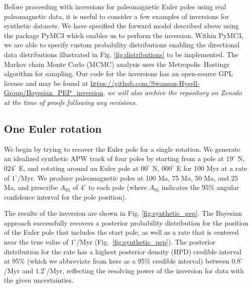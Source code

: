 \documentclass[11pt,letterpaper]{article}
\begin{document}
Before proceeding with inversions for paleomagnetic Euler poles using real paleomagnetic data, it is useful to consider a few examples of inversions for synthetic datasets. We have specified the forward model described above using the package PyMC3 \citep{Salvatier2016a} which enables us to perform the inversion. Within PyMC3, we are able to specify custom probability distributions enabling the directional data distributions illustrated in Fig. \ref{fig:distributions} to be implemented. The Markov chain Monte Carlo (MCMC) analysis uses the Metropolis–Hastings algorithm for sampling. Our code for the inversions has an open-source GPL license and may be found at \url{https://github.com/Swanson-Hysell-Group/Bayesian_PEP_inversion}. \textit{we will also archive the repository on Zenodo at the time of proofs following any revisions.}



\subsection*{One Euler rotation}
\label{sec:one_stage_pole}
We begin by trying to recover the Euler pole for a single rotation. We generate an idealized synthetic APW track of four poles by starting from a pole at $19^\circ$ N, $024^\circ$ E, and rotating around an Euler pole at $00^\circ$ N, $000^\circ$ E for 100 Myr at a rate of $1^\circ$/Myr. We produce paleomagnetic poles at 100 Ma, 75 Ma, 50 Ma, and 25 Ma, and prescribe $A_{95}$ of $4^\circ$ to each pole (where $A_{95}$ indicates the 95\% angular confidence interval for the pole position).

The results of the inversion are shown in Fig. \ref{fig:synthetic_pep}. The Bayesian approach successfully recovers a posterior probability distribution for the position of the Euler pole that includes the start pole, as well as a rate that is centered near the true value of $1^\circ$/Myr (Fig.~\ref{fig:synthetic_pep}). The posterior distribution for the rate has a highest posterior density (HPD) credible interval at 95\% (which we abbreviate from here as a 95\% credible interval) between $0.8^\circ$/Myr and $1.2^\circ$/Myr, reflecting the resolving power of the inversion for data with the given uncertainties.
\end{document}
